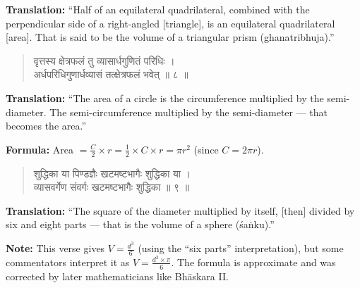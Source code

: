 \documentclass[11pt,a4paper]{article}
\newcommand{\dev}[1]{{\devanagarifont #1}}
\newenvironment{sanskritverse}{\begin{verse}\devanagarifont\large\centering}{\end{verse}}
\begin{document}
\vspace{0.3cm}
\noindent\textbf{Translation:} ``Half of an equilateral quadrilateral, combined with the perpendicular side of a right-angled [triangle], is an equilateral quadrilateral [area]. That is said to be the volume of a triangular prism (ghanatribhuja).''

\vspace{0.5cm}

\begin{tcolorbox}[colback=white,colframe=rulecolor,title={\dev{\textbf{गणित ८ — वृत्तक्षेत्रफलम् (Area of a Circle)}}}]
\begin{sanskritverse}
\dev{वृत्तस्य क्षेत्रफलं तु व्यासार्धगुणितं परिधिः ।\\
अर्धपरिधिगुणार्धव्यासं तत्क्षेत्रफलं भवेत् ॥ ८ ॥}
\end{sanskritverse}
\end{tcolorbox}

\vspace{0.3cm}
\noindent\textbf{Translation:} ``The area of a circle is the circumference multiplied by the semi-diameter. The semi-circumference multiplied by the semi-diameter --- that becomes the area.''

\smallskip
\noindent\textbf{Formula:} Area $= \frac{C}{2} \times r = \frac{1}{2} \times C \times r = \pi r^2$ (since $C = 2\pi r$).

\vspace{0.5cm}

\begin{tcolorbox}[colback=white,colframe=rulecolor,title={\dev{\textbf{गणित ९ — शङ्कुघनफलम् (Volume of a Sphere)}}}]
\begin{sanskritverse}
\dev{शुद्धिका या पिण्डज्ञैः खटमष्टभागैः शुद्धिका या ।\\
व्यासवर्गेण संवर्गः खटमष्टभागैः शुद्धिका ॥ ९ ॥}
\end{sanskritverse}
\end{tcolorbox}

\vspace{0.3cm}
\noindent\textbf{Translation:} ``The square of the diameter multiplied by itself, [then] divided by six and eight parts --- that is the volume of a sphere (śaṅku).''

\smallskip
\noindent\textbf{Note:} This verse gives $V = \frac{d^3}{6}$ (using the ``six parts'' interpretation), but some commentators interpret it as $V = \frac{d^3 \times \pi}{6}$. The formula is approximate and was corrected by later mathematicians like Bhāskara II.
\end{document}
